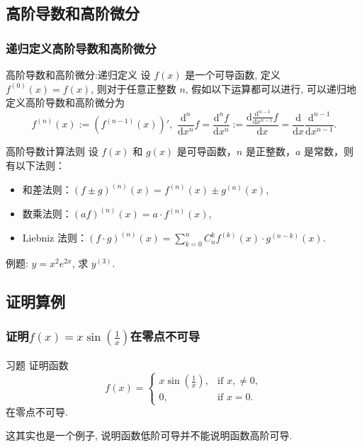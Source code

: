 \documentclass[
10pt,
aspectratio=43,
]{beamer}
\begin{document}
\subsection{高阶导数和高阶微分}
\begin{frame}
	\frametitle{递归定义高阶导数和高阶微分}

	\begin{block}{高阶导数和高阶微分:递归定义}
		设 $f(x)$ 是一个可导函数, 定义 $f^{(0)}(x) = f(x)$, 则对于任意正整数 $n$, 假如以下运算都可以进行, 可以递归地定义高阶导数和高阶微分为
		\[
			f^{(n)}(x) := \left(f^{(n-1)}(x)\right)',\,\,\frac{\mathrm{d}^n}{\mathrm{d}x^n}f=\frac{\mathrm{d}^nf}{\mathrm{d}x^n}:= \frac{\mathrm{d}\frac{\mathrm{d}^{n-1}}{\mathrm{d}x^{n-1}}f}{\mathrm{d}x}=\frac{\mathrm{d}}{\mathrm{d}x}\frac{\mathrm{d}^{n-1}}{\mathrm{d}x^{n-1}}.
		\]
	\end{block}
	\pause
	\begin{exampleblock}{高阶导数计算法则}
		设 $f(x)$ 和 $g(x)$ 是可导函数，$n$ 是正整数，$a$ 是常数，则有以下法则：

		\begin{itemize}
			\item 和差法则：$(f \pm g)^{(n)}(x) = f^{(n)}(x) \pm g^{(n)}(x)$,

			\item 数乘法则：$(af)^{(n)}(x) = a \cdot f^{(n)}(x)$,

			\item Liebniz 法则：$\displaystyle(f \cdot g)^{(n)}(x) = \sum_{k=0}^{n} C_n^k f^{(k)}(x) \cdot g^{(n-k)}(x)$.
		\end{itemize}
	\end{exampleblock}
	例题: $y=x^2 e^{2 x}$, 求 $y^{(3)}$. \pause
\end{frame}
\subsection{证明算例}

\begin{frame}
	\frametitle{证明$f(x)=x\sin\left(\frac{1}{x}\right)$在零点不可导}
	\begin{exampleblock}{习题}
		证明函数
		\[
			f(x) = \begin{cases}
				\displaystyle x\sin\left(\frac{1}{x}\right), & \text{if } x, \neq 0, \\
				0,                                           & \text{if } x = 0.
			\end{cases}
		\]
		在零点不可导.
	\end{exampleblock}
	这其实也是一个例子, 说明函数低阶可导并不能说明函数高阶可导.
\end{frame}
\end{document}
